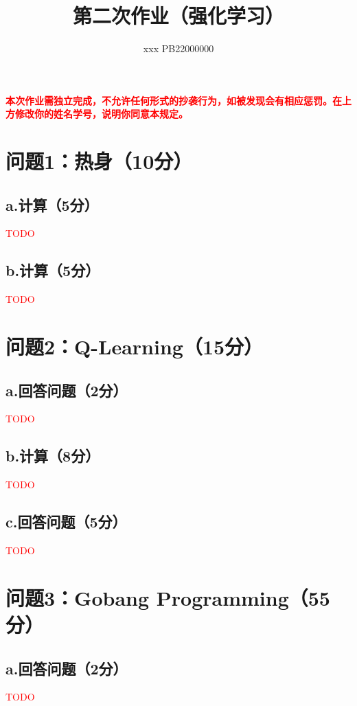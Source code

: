\documentclass{article}
\title{\bfseries 第二次作业（强化学习）}
\author{xxx  \quad  PB22000000}
\begin{document}
\maketitle
\textcolor{red}{\textbf{本次作业需独立完成，不允许任何形式的抄袭行为，如被发现会有相应惩罚。在上方修改你的姓名学号，说明你同意本规定。}}

\section*{问题1：热身（10分）}
\subsection*{a.计算（5分）}
\textcolor{red}{TODO}

\subsection*{b.计算（5分）}
\textcolor{red}{TODO}




\section*{问题2：Q-Learning（15分）}
\subsection*{a.回答问题（2分）}
\textcolor{red}{TODO} 

\subsection*{b.计算（8分）}
\textcolor{red}{TODO}

\subsection*{c.回答问题（5分）}
\textcolor{red}{TODO}


\section*{问题3：Gobang Programming（55分）}
\subsection*{a.回答问题（2分）}
\textcolor{red}{TODO}
\end{document}
